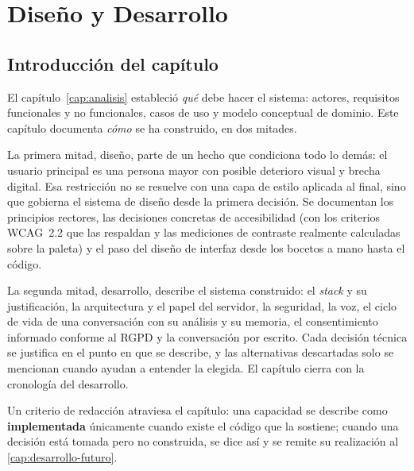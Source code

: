 \chapter{Diseño y Desarrollo}
\label{cap:diseno-desarrollo}

\newcommand{\partesep}[1]{%
  \bigskip
  \begin{center}\hrulefill\quad\textbf{\large #1}\quad\hrulefill\end{center}
  \addcontentsline{toc}{section}{#1}%
  \nopagebreak\medskip}

\section{Introducción del capítulo}

El capítulo~\ref{cap:analisis} estableció \emph{qué} debe hacer el sistema: actores, requisitos funcionales y no
funcionales, casos de uso y modelo conceptual de dominio. Este capítulo documenta \emph{cómo} se ha
construido, en dos mitades.

La primera mitad, diseño, parte de un hecho que condiciona todo lo demás: el usuario principal es una
persona mayor con posible deterioro visual y brecha digital. Esa restricción no se resuelve con una capa
de estilo aplicada al final, sino que gobierna el sistema de diseño desde la primera decisión. Se
documentan los principios rectores, las decisiones concretas de accesibilidad (con los criterios WCAG~2.2 que las respaldan y las mediciones de contraste realmente calculadas sobre la paleta) y el paso del
diseño de interfaz desde los bocetos a mano hasta el código.

La segunda mitad, desarrollo, describe el sistema construido: el \emph{stack} y su justificación, la
arquitectura y el papel del servidor, la seguridad, la voz, el ciclo de vida de una conversación con su
análisis y su memoria, el consentimiento informado conforme al RGPD y la conversación por escrito. Cada
decisión técnica se justifica en el punto en que se describe, y las alternativas descartadas solo se
mencionan cuando ayudan a entender la elegida. El capítulo cierra con la cronología del desarrollo.

Un criterio de redacción atraviesa el capítulo: una capacidad se describe como \textbf{implementada}
únicamente cuando existe el código que la sostiene; cuando una decisión está tomada pero no construida, se
dice así y se remite su realización al \autoref{cap:desarrollo-futuro}.

